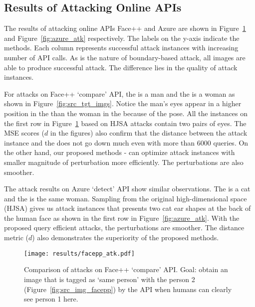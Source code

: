 \subsection{Results of Attacking Online APIs}
The results of attacking online APIs Face++ and Azure are shown in Figure~\ref{fig:facepp_atk} and Figure~\ref{fig:azure_atk} respectively.
The labels on the y-axis indicate the methods. Each column represents successful attack instances with increasing number of API calls. 
As is the nature of boundary-based attack, all images are able to produce successful attack. The difference lies in the quality of attack instances. 

For attacks on Face++ `compare' API, the \sourceimage is a man and the \targetimage is a woman as shown in Figure~\ref{fig:src_tgt_imgs}. Notice the man's eyes appear in a higher position in the \sourceimage than the woman in the \targetimage because of the pose. 
All the instances on the first row in Figure~\ref{fig:facepp_atk} based on HJSA attacks contain two pairs of eyes. The MSE scores ($d$ in the figures) also confirm that the distance between the attack instance and the \targetimage does not go down much even with more than 6000 queries. On the other hand, our proposed methods \name- can optimize attack instances with smaller magnitude of perturbation more efficiently. The perturbations are also smoother.

The attack results on Azure `detect' API show similar observations. The \sourceimage is a cat and the \targetimage is the same woman. Sampling from the original high-dimensional space (HJSA) gives us attack instances that presents two cat ear shapes at the back of the human face as shown in the first row in Figure~\ref{fig:azure_atk}. With the proposed query efficient attacks, the perturbations are smoother. The distance metric ($d$) also demonstrates the superiority of the proposed methods.

\begin{figure}[t]
    \centering
    \texttt{[image: results/facepp\_atk.pdf]}
    \caption{Comparison of attacks on Face++ `compare' API. Goal: obtain an image that is tagged as `same person' with the \sourceimage person 2 (Figure~\ref{fig:src_img_facepp}) by the API when humans can clearly see person 1 here.}
    \label{fig:facepp_atk}
    \vspace{-0.3cm}
\end{figure}

